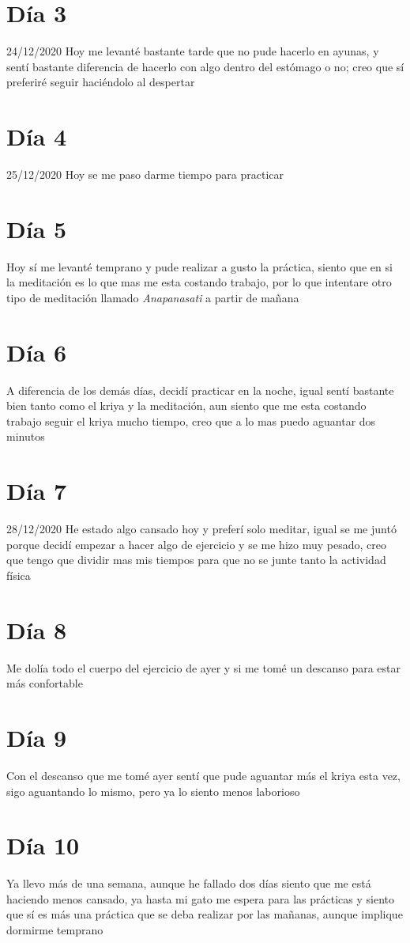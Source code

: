 \documentclass[11pt]{report}
\theoremstyle{plain}
\theoremstyle{definition}
\begin{document}
\section*{Día 3}
	24/12/2020
	Hoy me levanté bastante tarde que no pude hacerlo en ayunas, y sentí bastante diferencia de hacerlo con algo dentro del estómago o no; creo que sí preferiré seguir haciéndolo al despertar
\section*{Día 4}
	25/12/2020
	Hoy se me paso darme tiempo para practicar
\section*{Día 5}
	Hoy sí me levanté temprano y pude realizar a gusto la práctica, siento que en si la meditación es lo que mas me esta costando trabajo, por lo que intentare otro tipo de meditación llamado \textit{Anapanasati} a partir de mañana
\section*{Día 6}%
	A diferencia de los demás días, decidí practicar en la noche, igual sentí bastante bien tanto como el kriya y la meditación, aun siento que me esta costando trabajo seguir el kriya mucho tiempo, creo que a lo mas puedo aguantar dos minutos
\section*{Día 7}
	28/12/2020
	He estado algo cansado hoy y preferí solo meditar, igual se me juntó porque decidí empezar a hacer algo de ejercicio y se me hizo muy pesado, creo que tengo que dividir mas mis tiempos para que no se junte tanto la actividad física
\section*{Día 8}
	Me dolía todo el cuerpo del ejercicio de ayer y si me tomé un descanso para estar más confortable
\section*{Día 9}
	Con el descanso que me tomé ayer sentí que pude aguantar más el kriya esta vez, sigo aguantando lo mismo, pero ya lo siento menos laborioso
\section*{Día 10} %
	Ya llevo más de una semana, aunque he fallado dos días siento que me está haciendo menos cansado, ya hasta mi gato me espera para las prácticas y siento que sí es más una práctica que se deba realizar por las mañanas, aunque implique dormirme temprano
\end{document}
